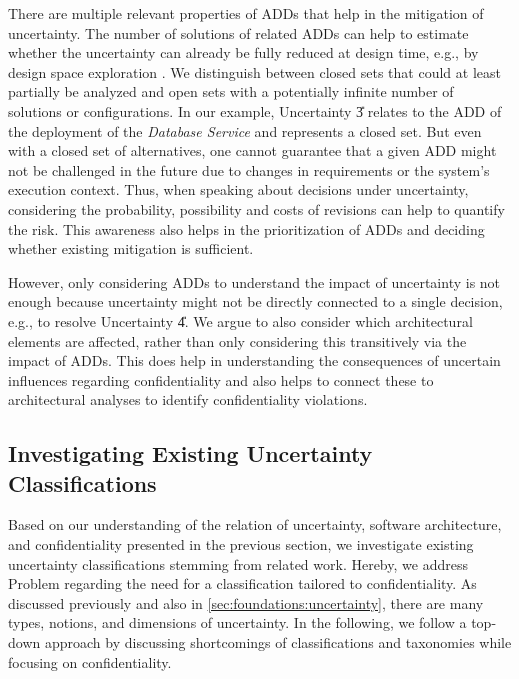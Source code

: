 There are multiple relevant properties of \acp{ADD} that help in the mitigation of uncertainty.
The number of solutions of related \acp{ADD} \cite{jansen_software_2005} can help to estimate whether the uncertainty can already be fully reduced at design time, e.g., by design space exploration \cite{esfahani_guidearch_2013,koziolek_peropteryx_2011}.
We distinguish between closed sets that could at least partially be analyzed and open sets with a potentially infinite number of solutions or configurations.
In our example, Uncertainty \U{3} relates to the \ac{ADD} of the deployment of the \emph{Database Service} and represents a closed set.
But even with a closed set of alternatives, one cannot guarantee that a given \ac{ADD} might not be challenged in the future \cite{kruchten_ontology_2004} due to changes in requirements or the system's execution context.
Thus, when speaking about decisions under uncertainty, considering the probability, possibility and costs of revisions can help to quantify the risk.
This awareness also helps in the prioritization of \acp{ADD} and deciding whether existing mitigation is sufficient.

However, only considering \acp{ADD} to understand the impact of uncertainty is not enough because uncertainty might not be directly connected to a single decision, e.g., to resolve Uncertainty \U{4}.
We argue to also consider which architectural elements are affected, rather than only considering this transitively via the impact of \acp{ADD}.
This does help in understanding the consequences of uncertain influences regarding confidentiality and also helps to connect these to architectural analyses to identify confidentiality violations.



\subsection{Investigating Existing Uncertainty Classifications}%
\label{sec:classification:investigating}

Based on our understanding of the relation of uncertainty, software architecture, and confidentiality presented in the previous section, we investigate existing uncertainty classifications stemming from related work.
Hereby, we address Problem  regarding the need for a classification tailored to confidentiality.
As discussed previously and also in \autoref{sec:foundations:uncertainty}, there are many types, notions, and dimensions of uncertainty.
In the following, we follow a top-down approach by discussing shortcomings of classifications and taxonomies while focusing on confidentiality.

